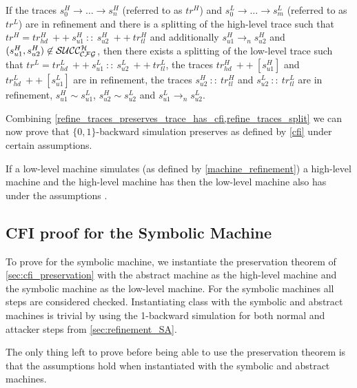 \begin{lemma}
\label{refine_traces_split}
\renewcommand{\baselinestretch}{1.25}\normalsize
If the traces $s^H_0 \to \ldots \to s^H_n$ (referred to as $tr^H$) and $s^L_0 \to
\ldots \to s^L_m$ (referred to as $tr^L$) are in refinement and there is a splitting
of the high-level trace such that $tr^H = tr^H_{hd} ~ ++ ~ s^H_{u1}
~ :: ~ s^H_{u2} ~ ++ ~ tr^H_{tl}$ and additionally $s^H_{u1} \to_n s^H_{u2}$
and $(s^H_{u1},s^H_{u2}) \not \in \mathcal{SUCC_\mathcal{CFG}^{H}}$, then there exists a
splitting of the low-level trace such that $tr^L = tr^L_{hd} ~ ++ ~
s^L_{u1} ~ :: ~ s^L_{u2} ~ ++ ~ tr^L_{tl}$, the traces $tr^H_{hd} ~ ++ ~
[s^H_{u1}]$ and $tr^L_{hd} ~ ++ ~ [s^L_{u1}]$ are in refinement, the
traces $s^H_{u2} ~ :: ~ tr^H_{tl}$ and $s^L_{u2} ~ :: ~ tr^L_{tl}$ are in
refinement, $s^H_{u1} \sim s^L_{u1}$, $s^H_{u2} \sim s^L_{u2}$ and
$s^L_{u1} \to_n s^L_{u2}$.
\end{lemma}

Combining
\cref{refine_traces_preserves_trace_has_cfi,refine_traces_split} we
can now prove that $\lbrace 0,1 \rbrace$-backward simulation preserves
\CFI as defined by \cref{cfi} under certain assumptions.

\begin{theorem}
\label{backward_refinement_preserves_cfi}
If a low-level machine simulates (as defined by
\cref{machine_refinement}) a high-level machine and the high-level
machine has \CFI then the low-level machine also has \CFI under the
assumptions .
\end{theorem}

\subsection{CFI proof for the Symbolic Machine}
\label{sec:symbolic_proof}

To prove \CFI for the symbolic machine, we instantiate the
preservation theorem of \cref{sec:cfi_preservation} with the abstract
machine as the high-level machine and the symbolic machine as the
low-level machine. For the symbolic machines all steps are considered
checked. Instantiating class  with the
symbolic and abstract machines is trivial by using the 1-backward simulation
for both normal and attacker steps from \cref{sec:refinement_SA}.

The only thing left to prove before being able to use the \CFI
preservation theorem is that the
assumptions  hold when
instantiated with the symbolic and abstract machines.


